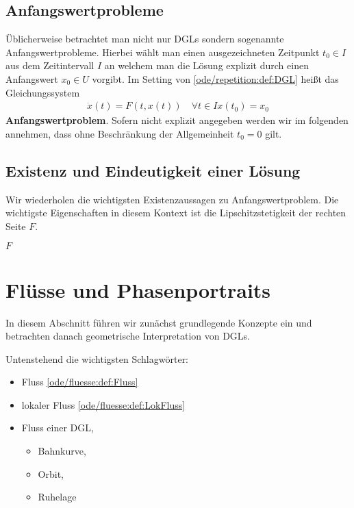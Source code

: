 \subsection{Anfangswertprobleme}
\label{\detokenize{ode/repetition:anfangswertprobleme}}
Üblicherweise betrachtet man nicht nur DGLs sondern sogenannte Anfangswertprobleme. Hierbei wählt man einen ausgezeichneten Zeitpunkt \(t_0\in I\) aus dem Zeitintervall \(I\) an welchem man die Lösung explizit durch einen Anfangswert \(x_0\in U\) vorgibt. Im Setting von \cref{ode/repetition:def:DGL} heißt
das Gleichungssystem
\begin{align}\label{equation:ode/repetition:eq:AWP}
\dot{x}(t) = F(t, x(t))\quad\forall t\in I
x(t_0) = x_0
\end{align}
\textbf{Anfangswertproblem}. Sofern nicht explizit angegeben werden wir im folgenden annehmen, dass ohne Beschränkung der Allgemeinheit \(t_0=0\) gilt.


\subsection{Existenz und Eindeutigkeit einer Lösung}
\label{\detokenize{ode/repetition:existenz-und-eindeutigkeit-einer-losung}}
Wir wiederholen die wichtigsten Existenzaussagen zu Anfangswertproblem. Die wichtigste Eigenschaften in diesem Kontext ist die Lipschitzstetigkeit der rechten Seite \(F\).
\label{ode/repetition:definition-3}
\begin{definition}{}{}



\(F\)
\end{definition}


\section{Flüsse und Phasenportraits}
\label{\detokenize{ode/fluesse:flusse-und-phasenportraits}}\label{\detokenize{ode/fluesse:s-fluesse}}\label{\detokenize{ode/fluesse::doc}}
In diesem Abschnitt führen wir zunächst grundlegende Konzepte ein und betrachten danach geometrische Interpretation von DGLs.

Untenstehend die wichtigsten Schlagwörter:
\begin{itemize}
\item {} 
Fluss \cref{ode/fluesse:def:Fluss} 

\item {} 
lokaler Fluss \cref{ode/fluesse:def:LokFluss} 

\item {} 
Fluss einer DGL,
\begin{itemize}
\item {} 
Bahnkurve,

\item {} 
Orbit,

\item {} 
Ruhelage

\end{itemize}

\end{itemize}


